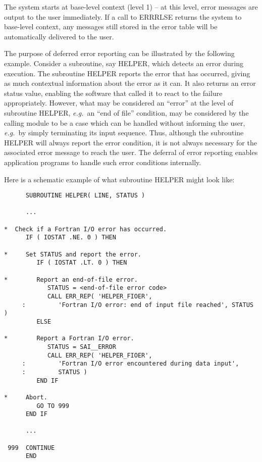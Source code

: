 \documentclass[twoside,11pt]{article}
\renewcommand{\_}{\texttt{\symbol{95}}}
\begin{document}
The system starts at base-level context (level 1) -- at this level, error 
messages are output to the user immediately.
If a call to ERR\_RLSE returns the system to base-level context, any messages
still stored in the error table will be automatically delivered to the user.

The purpose of deferred error reporting can be illustrated by the following
example.
Consider a subroutine, say HELPER, which detects an error during execution. 
The subroutine HELPER reports the error that has occurred, giving as much
contextual information about the error as it can.
It also returns an error status value, enabling the software that called it
to react to the failure appropriately. 
However, what may be considered an ``error'' at the level of subroutine
HELPER, \textit{e.g.}\ an ``end of file'' condition, may be considered by the
calling module to be a case which can be handled without informing the user,
\textit{e.g.}\ by simply terminating its input sequence. 
Thus, although the subroutine HELPER will always report the error condition,
it is not always necessary for the associated error message to reach the
user. 
The deferral of error reporting enables application programs to handle such 
error conditions internally.

Here is a schematic example of what subroutine HELPER might look like:

\begin {small}
\begin{verbatim}
      SUBROUTINE HELPER( LINE, STATUS )

      ...

*  Check if a Fortran I/O error has occurred.
      IF ( IOSTAT .NE. 0 ) THEN

*     Set STATUS and report the error.
         IF ( IOSTAT .LT. 0 ) THEN

*        Report an end-of-file error.
            STATUS = <end-of-file error code>
            CALL ERR_REP( 'HELPER_FIOER', 
     :         'Fortran I/O error: end of input file reached', STATUS )
         ELSE

*        Report a Fortran I/O error.
            STATUS = SAI__ERROR
            CALL ERR_REP( 'HELPER_FIOER', 
     :         'Fortran I/O error encountered during data input',
     :         STATUS )
         END IF

*     Abort.
         GO TO 999
      END IF

      ...

 999  CONTINUE
      END
\end{verbatim}
\end {small}
\end{document}
